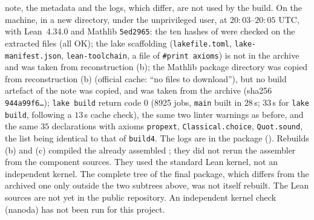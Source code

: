 \documentclass[11pt,a4paper]{article}
\theoremstyle{plain}
\theoremstyle{definition}
\theoremstyle{remark}
\numberwithin{equation}{section}
\begin{document}
note, the metadata and the logs, which differ, are not used by the build. On the machine, in a new directory, under the unprivileged user, at
$20{:}03$--$20{:}05$ UTC, with Lean~4.34.0 and Mathlib \texttt{5ed2965}: the ten hashes of  were checked on the extracted files (all OK);
the lake scaffolding (\texttt{lakefile.toml}, \texttt{lake-manifest.json}, \texttt{lean-toolchain}, a file of \texttt{\#print axioms}) is not in the archive and was taken from
reconstruction (b); the Mathlib package directory was copied from reconstruction (b) (official cache: ``no files to download''), but no build artefact of the note was
copied, and  was taken from the archive (sha256 \texttt{944a99f6\dots}); \texttt{lake build} return code $0$ (8925 jobs, \texttt{main} built in $28$\,s; $33$\,s for \texttt{lake build}, following a $13$\,s cache check), the
same two linter warnings as before, and the same $35$ declarations with axioms \texttt{propext}, \texttt{Classical.choice}, \texttt{Quot.sound}, the list being identical to that of \texttt{build4}. The logs are
in the package (). Rebuilds (b) and (c) compiled the already assembled ; they did not rerun the assembler from the component sources. They used the standard Lean kernel, not an independent kernel. The complete tree of the final package, which differs from the archived one only outside the two subtrees above, was not itself rebuilt. The Lean sources are not yet in the public repository. An independent kernel check (nanoda) has not been run for this project.
\end{document}
